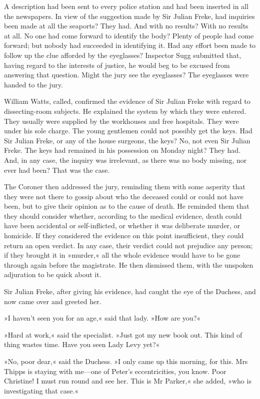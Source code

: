 A description had been sent to every police station and had been inserted in all the newspapers. In view of the suggestion made by Sir Julian Freke, had inquiries been made at all the seaports? They had. And with no results? With no results at all. No one had come forward to identify the body? Plenty of people had come forward; but nobody had succeeded in identifying it. Had any effort been made to follow up the clue afforded by the eyeglasses? Inspector Sugg submitted that, having regard to the interests of justice, he would beg to be excused from answering that question. Might the jury see the eyeglasses? The eyeglasses were handed to the jury.

William Watts, called, confirmed the evidence of Sir Julian Freke with regard to dissecting-room subjects. He explained the system by which they were entered. They usually were supplied by the workhouses and free hospitals. They were under his sole charge. The young gentlemen could not possibly get the keys. Had Sir Julian Freke, or any of the house surgeons, the keys? No, not even Sir Julian Freke. The keys had remained in his possession on Monday night? They had. And, in any case, the inquiry was irrelevant, as there was no body missing, nor ever had been? That was the case.

The Coroner then addressed the jury, reminding them with some asperity that they were not there to gossip about who the deceased could or could not have been, but to give their opinion as to the cause of death. He reminded them that they should consider whether, according to the medical evidence, death could have been accidental or self-inflicted, or whether it was deliberate murder, or homicide. If they considered the evidence on this point insufficient, they could return an open verdict. In any case, their verdict could not prejudice any person; if they brought it in »murder,« all the whole evidence would have to be gone through again before the magistrate. He then dismissed them, with the unspoken adjuration to be quick about it.

Sir Julian Freke, after giving his evidence, had caught the eye of the Duchess, and now came over and greeted her.

»I haven't seen you for an age,« said that lady. »How are you?«

»Hard at work,« said the specialist. »Just got my new book out. This kind of thing wastes time. Have you seen Lady Levy yet?«

»No, poor dear,« said the Duchess. »I only came up this morning, for this. Mrs Thipps is staying with me\allowbreak---\allowbreak one of Peter's eccentricities, you know. Poor Christine! I must run round and see her. This is Mr Parker,« she added, »who is investigating that case.«

